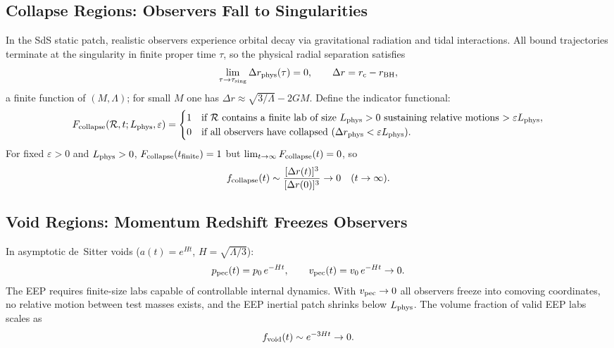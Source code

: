 \documentclass[11pt,letterpaper]{article}
\begin{document}
\subsection{Collapse Regions: Observers Fall to Singularities}
In the SdS static patch, realistic observers experience orbital decay via
gravitational radiation and tidal interactions. All bound trajectories terminate
at the singularity in finite proper time $\tau$, so the physical radial separation
satisfies
\begin{equation}
\lim_{\tau\to\tau_{\rm sing}}\Delta r_{\rm phys}(\tau)=0,\qquad
\Delta r = r_{\rm c}-r_{\rm BH},
\end{equation}
a finite function of $(M,\Lambda)$; for small $M$ one has
$\Delta r\approx\sqrt{3/\Lambda}-2GM$.
Define the indicator functional:
\begin{equation}
F_{\rm collapse}(\mathcal{R},t;L_{\rm phys},\varepsilon)=
\begin{cases}
1 & \text{if $\mathcal{R}$ contains a finite lab of size $L_{\rm phys}>0$
          sustaining relative motions $>\varepsilon L_{\rm phys}$},\\
0 & \text{if all observers have collapsed
          ($\Delta r_{\rm phys}<\varepsilon L_{\rm phys}$)}.
\end{cases}
\end{equation}
For fixed $\varepsilon>0$ and $L_{\rm phys}>0$, $F_{\rm collapse}(t_{\rm finite})=1$
but $\lim_{t\to\infty}F_{\rm collapse}(t)=0$, so
\begin{equation}
f_{\rm collapse}(t)\sim\frac{[\Delta r(t)]^3}{[\Delta r(0)]^3}\to 0
\quad(t\to\infty).
\end{equation}

\subsection{Void Regions: Momentum Redshift Freezes Observers}
In asymptotic de~Sitter voids ($a(t)=e^{Ht}$, $H=\sqrt{\Lambda/3}$):
\begin{equation}
p_{\rm pec}(t)=p_0\,e^{-Ht},\qquad v_{\rm pec}(t)=v_0\,e^{-Ht}\to 0.
\end{equation}
The EEP requires finite-size labs capable of controllable internal dynamics. With
$v_{\rm pec}\to 0$ all observers freeze into comoving coordinates, no relative
motion between test masses exists, and the EEP inertial patch shrinks below
$L_{\rm phys}$. The volume fraction of valid EEP labs scales as
\begin{equation}
f_{\rm void}(t)\sim e^{-3Ht}\to 0.
\end{equation}
\end{document}
